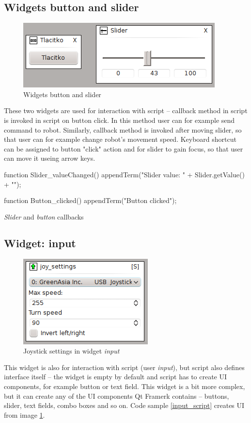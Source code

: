 \documentclass[12pt, a4paper, oneside]{article}
\newcommand{\It}{\textit}  %
\begin{document}
\subsection{Widgets button and slider}
\begin{figure}[H]
\begin{center}
\includegraphics[scale=1]{img/w_btn_slider.png}
\caption{Widgets button and slider}
\end{center}
\end{figure}
These two widgets are used for interaction with script -- callback method in script is invoked in script on button click. In this method user can for example send command to robot. Similarly, callback method is invoked after moving slider, so that user can for example change robot's movement speed. Keyboard shortcut can be assigned to button "click" action and for slider to gain focus, so that user can move it useing arrow keys.
\begin{listing}[H]
\begin{jscode}
function Slider_valueChanged() {
    appendTerm("Slider value: " + Slider.getValue() + "\n");
}

function Button_clicked() {
    appendTerm("Button clicked\n");
}
\end{jscode}
\caption{\It{Slider} and \It{button} callbacks}
\end{listing}

\subsection{Widget: input}
\begin{figure}[H]
\begin{center}
\includegraphics[scale=1]{img/w_input.png}
\caption{Joystick settings in widget \It{input}}
\label{input}
\end{center}
\end{figure}
This widget is also for interaction with script (user \It{input}), but script also defines interface itself -- the widget is empty by default and script has to create UI components, for example button or text field. This widget is a bit more complex, but it can create any of the UI components Qt Framerk contains -- buttons, slider, text fields, combo boxes and so on. Code sample \ref{input_script} creates UI from image \ref{input}.
\end{document}
